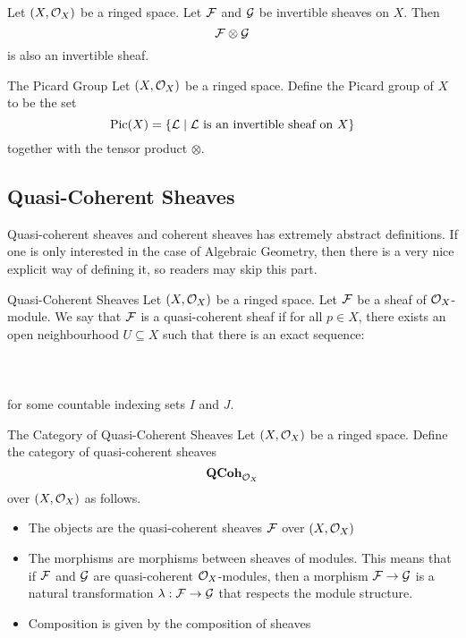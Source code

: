 \documentclass[a4paper]{article}
\begin{document}
\begin{prp}{}{} Let $(X,\mathcal{O}_X)$ be a ringed space. Let $\mathcal{F}$ and $\mathcal{G}$ be invertible sheaves on $X$. Then $$\mathcal{F}\otimes\mathcal{G}$$ is also an invertible sheaf. 
\end{prp}

\begin{defn}{The Picard Group}{} Let $(X,\mathcal{O}_X)$ be a ringed space. Define the Picard group of $X$ to be the set $$\text{Pic}(X)=\{\mathcal{L}\;|\;\mathcal{L}\text{ is an invertible sheaf on }X\}$$ together with the tensor product $\otimes$. 
\end{defn}

\subsection{Quasi-Coherent Sheaves}
Quasi-coherent sheaves and coherent sheaves has extremely abstract definitions. If one is only interested in the case of Algebraic Geometry, then there is a very nice explicit way of defining it, so readers may skip this part. 

\begin{defn}{Quasi-Coherent Sheaves}{} Let $(X,\mathcal{O}_X)$ be a ringed space. Let $\mathcal{F}$ be a sheaf of $\mathcal{O}_X$-module. We say that $\mathcal{F}$ is a quasi-coherent sheaf if for all $p\in X$, there exists an open neighbourhood $U\subseteq X$ such that there is an exact sequence: \\~\\
\\~\\
for some countable indexing sets $I$ and $J$. 
\end{defn}

\begin{defn}{The Category of Quasi-Coherent Sheaves}{} Let $(X,\mathcal{O}_X)$ be a ringed space. Define the category of quasi-coherent sheaves $$\bold{QCoh}_{\mathcal{O}_X}$$ over $(X,\mathcal{O}_X)$ as follows. 
\begin{itemize}
\item The objects are the quasi-coherent sheaves $\mathcal{F}$ over $(X,\mathcal{O}_X)$
\item The morphisms are morphisms between sheaves of modules. This means that if $\mathcal{F}$ and $\mathcal{G}$ are quasi-coherent $\mathcal{O}_X$-modules, then a morphism $\mathcal{F}\to\mathcal{G}$ is a natural transformation $\lambda:\mathcal{F}\to\mathcal{G}$ that respects the module structure. 
\item Composition is given by the composition of sheaves
\end{itemize}
\end{defn}
\end{document}
